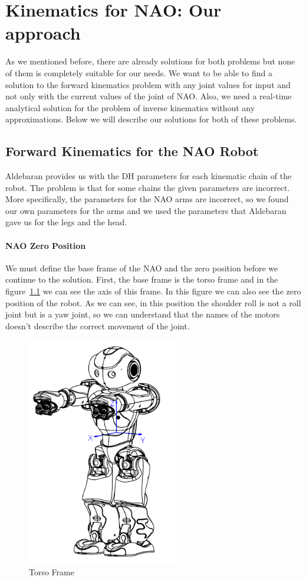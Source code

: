 \chapter{Kinematics for NAO: Our approach}
\label{approach}
As we mentioned before, there are already solutions for both problems but none of them is completely suitable for our needs. We want to be able to find a solution to the forward kinematics problem with any joint values for input and not only with the current values of the joint of NAO. Also, we need a real-time analytical solution for the problem of inverse kinematics without any approximations. Below we will describe our solutions for both of these problems.
\section{Forward Kinematics for the NAO Robot}
Aldebaran provides us with the DH parameters for each kinematic chain of the robot. The problem is that for some chains the given parameters are incorrect. More specifically, the parameters for the NAO arms are incorrect, so we found our own parameters for the arms and we used the parameters that Aldebaran gave us for the legs and the head.


\subsubsection*{NAO Zero Position}
We must define the base frame of the NAO and the zero position before we continue to the solution. First, the base frame is the torso frame and in the figure~\ref{fig:torso} we can see the axis of this frame. In this figure we can also see the zero position of the robot. As we can see, in this position the shoulder roll is not a roll joint but is a yaw joint, so we can understand that the names of the motors doesn't describe the correct movement of the joint.

\begin{figure}[h]
	\begin{center}
		\includegraphics[height = 10cm]{Figures/torso_frame.png}
 		\caption{Torso Frame}
 		\label{fig:torso}
	\end{center}
\end{figure}


